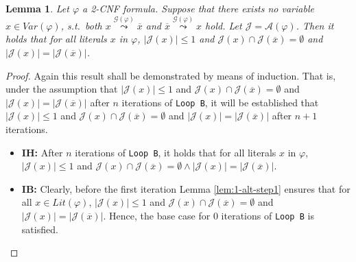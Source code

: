 \documentclass [11pt]{article}
\def\ox{\overline{x}}
\newcommand{\var}{\mathit{Var}}
\newcommand{\lit}{\mathit{Lit}}
\newtheorem{lemma}[theorem]{Lemma}
\newcommand{\sreach}[1]{\stackrel{#1}{\leadsto}}
\begin{document}
\begin{lemma}
\label{lem:1-alt-step2}
Let $\varphi$ a 2-CNF formula. Suppose that there exists no variable $x \in \var(\varphi)$, s.t.\ both $x \sreach{\mathcal{G}(\varphi)} \ox$ and $\ox \sreach{\mathcal{G}(\varphi)}  x$ hold.
Let  $\mathcal{J}=\mathcal{A}(\varphi)$. Then it holds that for all literals $x$ in $\varphi$, $|\mathcal{J}(x)|\leq 1$ and $\mathcal{J}(x) \cap \mathcal{J}(\overline{x}) = \emptyset$ and $|\mathcal{J}(x)| =| \mathcal{J}(\overline{x})|$.
\end{lemma}
\begin{proof}
Again this result shall be demonstrated by means of induction. That is, under the assumption that $|\mathcal{J}(x)|\leq 1$ and $\mathcal{J}(x) \cap \mathcal{J}(\overline{x}) = \emptyset$ and $|\mathcal{J}(x)| =| \mathcal{J}(\overline{x})|$ after $n$ iterations of \texttt{Loop B}, it will be established that $|\mathcal{J}(x)|\leq 1$ and $\mathcal{J}(x) \cap \mathcal{J}(\overline{x}) = \emptyset$  and $|\mathcal{J}(x)| =| \mathcal{J}(\overline{x})|$ after $n+1$ iterations.

\begin{itemize}
\item \textbf{IH:} After $n$ iterations of \texttt{Loop B}, it holds that for all literals $x$ in $\varphi$, $|\mathcal{J}(x)|\leq 1$ and $\mathcal{J}(x) \cap \mathcal{J}(\overline{x}) = \emptyset \land |\mathcal{J}(x)| = |\mathcal{J}(\overline{x})|$.
\item \textbf{IB:} Clearly, before the first iteration Lemma \ref{lem:1-alt-step1} ensures that for all $x \in \lit(\varphi)$, $|\mathcal{J}(x)|\leq 1$ and $\mathcal{J}(x) \cap \mathcal{J}(\overline{x}) = \emptyset$ and $|\mathcal{J}(x)| =| \mathcal{J}(\overline{x})|$. Hence, the base case for $0$ iterations of \texttt{Loop B} is satisfied.


\end{itemize}
\end{proof}
\end{document}
